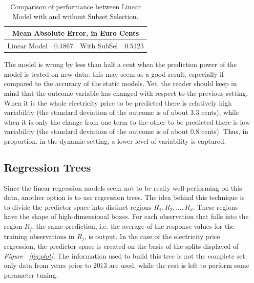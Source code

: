 \documentclass[a4paper,12pt]{book}
\begin{document}
\begin{table}[tb]
\begin{center}
\begin{tabular}{|c|c|c|c|}
\hline
\multicolumn{4}{|c|}{Mean Absolute Error, in Euro Cents}\\
\hline
Linear Model&0.4867&With SubSel&0.5123\\
\hline
\end{tabular}
\caption{Comparison of performance between Linear Model with and without Subset Selection.}
\label{Tab:euro}
\end{center}
\end{table}

The model is wrong by less than half a cent when the prediction power of the model is tested on new data: this may seem as a good result, especially if compared to the accuracy of the static models. Yet, the reader should keep in mind that the outcome variable has changed with respect to the previous setting. When it is the whole electricity price to be predicted there is relatively high variability (the standard deviation of the outcome is of about 3.3 cents), while when it is only the change from one term to the other to be predicted there is low variability (the standard deviation of the outcome is of about 0.8 cents). Thus, in proportion, in the dynamic setting, a lower level of variability is captured.

\subsection{Regression Trees}

Since the linear regression models seem not to be really well-performing on this data, another option is to use regression trees. The idea behind this technique is to divide the predictor space into distinct regions $R_1, R_2, ..., R_J$. These regions have the shape of high-dimensional boxes. For each observation that falls into the region $R_j$, the same prediction, i.e. the average of the response values for the training observations in $R_j$, is output. In the case of the electricity price regression, the predictor space is created on the basis of the splits displayed of \textit{Figure ~\ref{fig:plot}}. The information used to build this tree is not the complete set: only data from years prior to 2013 are used, while the rest is left to perform some parameter tuning.
\end{document}
